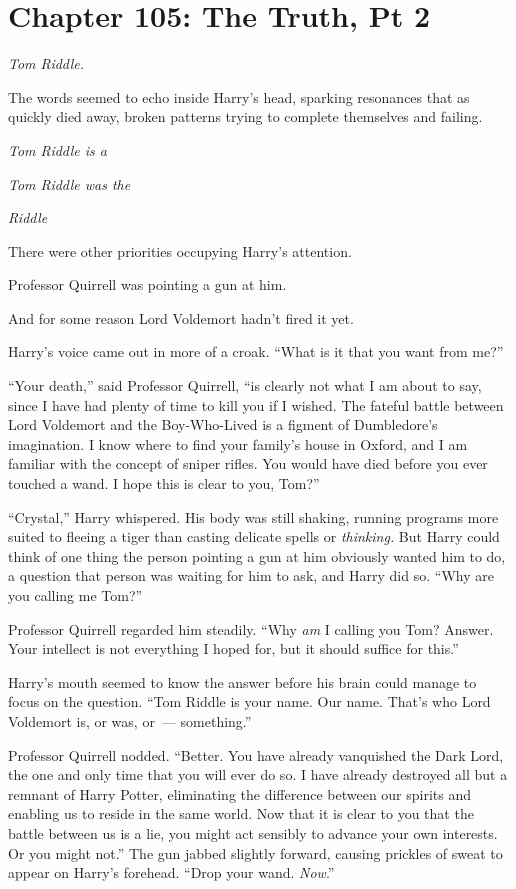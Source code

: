 \chapter{Chapter 105: The Truth, Pt 2}
\emph{Tom Riddle.}

The words seemed to echo inside Harry's head, sparking resonances that as quickly died away, broken patterns trying to complete themselves and failing.

\emph{Tom Riddle is a}

\emph{Tom Riddle was the}

\emph{Riddle}

There were other priorities occupying Harry's attention.

Professor Quirrell was pointing a gun at him.

And for some reason Lord Voldemort hadn't fired it yet.

Harry's voice came out in more of a croak. ``What is it that you want from me?''

``Your death,'' said Professor Quirrell, ``is clearly not what I am about to say, since I have had plenty of time to kill you if I wished. The fateful battle between Lord Voldemort and the Boy-Who-Lived is a figment of Dumbledore's imagination. I know where to find your family's house in Oxford, and I am familiar with the concept of sniper rifles. You would have died before you ever touched a wand. I hope this is clear to you, Tom?''

``Crystal,'' Harry whispered. His body was still shaking, running programs more suited to fleeing a tiger than casting delicate spells or \emph{thinking.} But Harry could think of one thing the person pointing a gun at him obviously wanted him to do, a question that person was waiting for him to ask, and Harry did so. ``Why are you calling me Tom?''

Professor Quirrell regarded him steadily. ``Why \emph{am} I calling you Tom? Answer. Your intellect is not everything I hoped for, but it should suffice for this.''

Harry's mouth seemed to know the answer before his brain could manage to focus on the question. ``Tom Riddle is your name. Our name. That's who Lord Voldemort is, or was, or~--- something.''

Professor Quirrell nodded. ``Better. You have already vanquished the Dark Lord, the one and only time that you will ever do so. I have already destroyed all but a remnant of Harry Potter, eliminating the difference between our spirits and enabling us to reside in the same world. Now that it is clear to you that the battle between us is a lie, you might act sensibly to advance your own interests. Or you might not.'' The gun jabbed slightly forward, causing prickles of sweat to appear on Harry's forehead. ``Drop your wand. \emph{Now}.''

